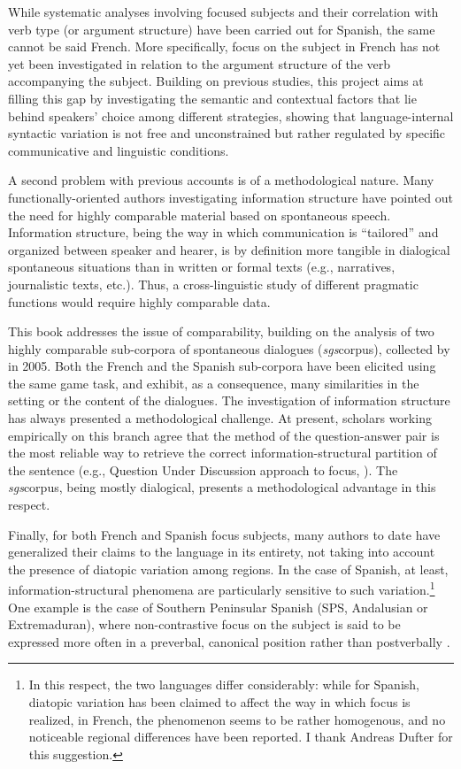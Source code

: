  While systematic analyses involving focused subjects and their correlation with verb type (or argument structure) have been carried out for Spanish, the same cannot be said French. More specifically, focus on the subject in French has not yet been investigated in relation to the argument structure of the verb accompanying the subject. 
Building on previous studies, this project aims at filling this gap by investigating the semantic and contextual factors that lie behind speakers' choice among different strategies, showing that language-internal syntactic variation is not free and unconstrained but rather regulated by specific communicative and linguistic conditions.

A second problem with previous accounts is of a methodological nature. Many functionally-oriented authors investigating information structure have pointed out the need for highly comparable material based on spontaneous speech. Information structure, being the way in which communication is ``tailored” \parencite{prince1981towards} and organized between speaker and hearer, is by definition more tangible in dialogical spontaneous situations than in written or formal texts (e.g., narratives, journalistic texts, etc.). Thus, a cross-linguistic study of different pragmatic functions would require highly comparable data. 

This book addresses the issue of comparability, building on the analysis of two highly comparable sub-corpora of spontaneous dialogues (\textit{sgs}corpus), collected by \textcite{adli2011gradient} in 2005. Both the French and the Spanish sub-corpora have been elicited using the same game task, and exhibit, as a consequence, many similarities in the setting or the content of the dialogues. The investigation of information structure has always presented a methodological challenge. At present, scholars working empirically on this branch agree that the method of the question-answer pair is the most reliable way to retrieve the correct information-structural partition of the sentence (e.g., Question Under Discussion approach to focus, \cite{roberts1996information, riester2018annotation, riester2019constructing}). The \textit{sgs}corpus, being mostly dialogical, presents a methodological advantage in this respect.

Finally, for both French and Spanish focus subjects, many authors to date have generalized their claims to the language in its entirety, not taking into account the presence of diatopic variation among regions. In the case of Spanish, at least, information-structural phenomena are particularly sensitive to such variation.\footnote{In this respect, the two languages differ considerably: while for Spanish, diatopic variation has been claimed to affect the way in which focus is realized, in French, the phenomenon seems to be rather homogenous, and no noticeable regional differences have been reported. I thank Andreas Dufter for this suggestion.} One example is the case of Southern Peninsular Spanish (SPS, Andalusian or Extremaduran), where non-contrastive focus on the subject is said to be expressed more often in a preverbal, canonical position rather than postverbally \parencite{jimenez2015focus}. 

